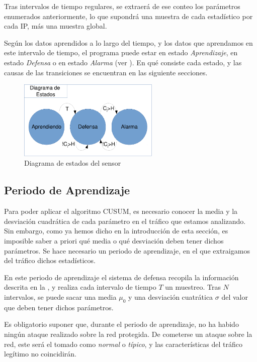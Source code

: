 Tras intervalos de tiempo regulares, se extraerá de ese conteo los parámetros enumerados anteriormente, lo que supondrá 
una muestra de cada estadístico por cada IP, más una muestra global.

Según los datos aprendidos a lo largo del tiempo, y los datos que aprendamos en este intervalo de tiempo, el programa 
puede estar en estado \emph{Aprendizaje}, en estado \emph{Defensa} o en estado \emph{Alarma} (ver 
). En qué consiste cada estado, y las causas de las transiciones se encuentran en las siguiente 
secciones.

\begin{figure}[htbp]
\centering
\includegraphics[width=0.6\textwidth]{CapituloCusum/Figuras/DiagramaEstados-crop}
\caption{Diagrama de estados del sensor}
\end{figure}
%

\subsection{Periodo de Aprendizaje}
Para poder aplicar el algoritmo CUSUM, es necesario conocer la media y la desviación cuadrática de cada parámetro en el 
tráfico que estamos analizando. Sin embargo, como ya hemos dicho en la introducción de esta sección, es imposible saber 
a priori qué media o qué desviación deben tener dichos parámetros. Se hace necesario un periodo de aprendizaje, en el 
que extraigamos del tráfico dichos estadísticos.

En este periodo de aprendizaje el sistema de defensa recopila la información descrita en la 
, y realiza cada intervalo de tiempo $T$ un muestreo. Tras $N$ intervalos, se puede sacar 
una media $\mu_0$ y una desviación cuatrática $\sigma$ del valor que deben tener dichos parámetros.

Es obligatorio suponer que, durante el periodo de aprendizaje, no ha habido ningún ataque realizado sobre la red 
protegida. De cometerse un ataque sobre la red, este será el tomado como \emph{normal} o \emph{típico}, y las 
características del tráfico legítimo no coincidirán.

